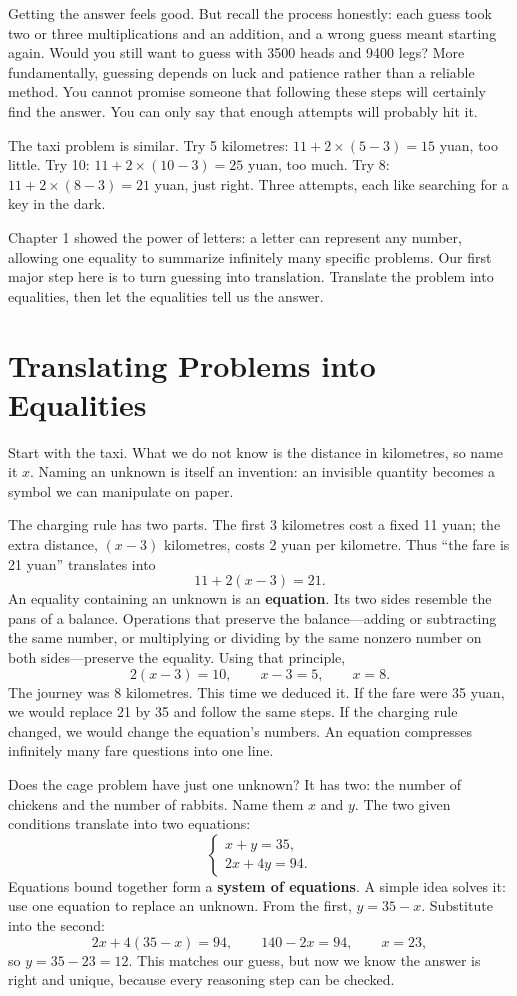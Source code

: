 Getting the answer feels good. But recall the process honestly: each guess took two or three multiplications and an addition, and a wrong guess meant starting again. Would you still want to guess with 3500 heads and 9400 legs? More fundamentally, guessing depends on luck and patience rather than a reliable method. You cannot promise someone that following these steps will certainly find the answer. You can only say that enough attempts will probably hit it.

The taxi problem is similar. Try 5 kilometres: $11 + 2 \times (5-3) = 15$ yuan, too little. Try 10: $11 + 2 \times (10-3) = 25$ yuan, too much. Try 8: $11 + 2 \times (8-3) = 21$ yuan, just right. Three attempts, each like searching for a key in the dark.

Chapter 1 showed the power of letters: a letter can represent any number, allowing one equality to summarize infinitely many specific problems. Our first major step here is to turn guessing into translation. Translate the problem into equalities, then let the equalities tell us the answer.

\section{Translating Problems into Equalities}

Start with the taxi. What we do not know is the distance in kilometres, so name it $x$. Naming an unknown is itself an invention: an invisible quantity becomes a symbol we can manipulate on paper.

The charging rule has two parts. The first 3 kilometres cost a fixed 11 yuan; the extra distance, $(x - 3)$ kilometres, costs 2 yuan per kilometre. Thus ``the fare is 21 yuan'' translates into
\[
11 + 2(x - 3) = 21.
\]
An equality containing an unknown is an \textbf{equation}. Its two sides resemble the pans of a balance. Operations that preserve the balance---adding or subtracting the same number, or multiplying or dividing by the same nonzero number on both sides---preserve the equality. Using that principle,
\[
2(x - 3) = 10,\qquad x - 3 = 5,\qquad x = 8.
\]
The journey was 8 kilometres. This time we deduced it. If the fare were 35 yuan, we would replace 21 by 35 and follow the same steps. If the charging rule changed, we would change the equation's numbers. An equation compresses infinitely many fare questions into one line.

Does the cage problem have just one unknown? It has two: the number of chickens and the number of rabbits. Name them $x$ and $y$. The two given conditions translate into two equations:
\[
\begin{cases}
x + y = 35,\\
2x + 4y = 94.
\end{cases}
\]
Equations bound together form a \textbf{system of equations}. A simple idea solves it: use one equation to replace an unknown. From the first, $y = 35 - x$. Substitute into the second:
\[
2x + 4(35 - x) = 94,\qquad 140 - 2x = 94,\qquad x = 23,
\]
so $y = 35 - 23 = 12$. This matches our guess, but now we know the answer is right and unique, because every reasoning step can be checked.

